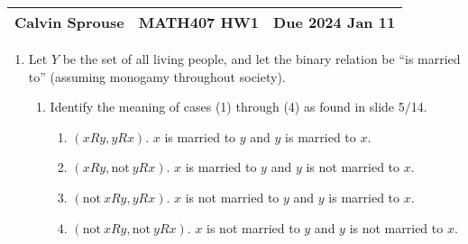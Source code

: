\documentclass[a4paper, 12pt]{config/homework}
\begin{document}
\noindent
\begin{tabularx}{\textwidth}{>{\centering\arraybackslash}X>{\centering\arraybackslash}X>{\centering\arraybackslash}X}
Calvin Sprouse & MATH407 HW1 & Due 2024 Jan 11\\
\midrule
\end{tabularx}

\begin{enumerate}
\item Let \(Y\) be the set of all living people, and let the binary relation be ``is married to'' (assuming monogamy throughout society).
\begin{enumerate}[label=(\alph*)]

\item Identify the meaning of cases (1) through (4) as found in slide 5/14.
\begin{enumerate}[label=Case (\arabic*).]
\item \(\left(xRy, yRx\right)\). \(x\) is married to \(y\) and \(y\) is married to \(x\).
\item \(\left(xRy, \text{not}\ yRx\right)\). \(x\) is married to \(y\) and \(y\) is not married to \(x\).
\item \(\left(\text{not}\ xRy, yRx\right)\). \(x\) is not married to \(y\) and \(y\) is married to \(x\).
\item \(\left(\text{not}\ xRy, \text{not}\ yRx\right)\). \(x\) is not married to \(y\) and \(y\) is not married to \(x\).
\end{enumerate}


\end{enumerate}
\end{enumerate}
\end{document}
